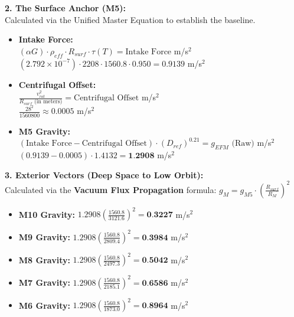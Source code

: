 \documentclass[11pt, a4paper]{article}
\begin{document}
  \vspace{1.0em}
  \noindent \textbf{2. The Surface Anchor (M5):} \\
  \hspace*{1em} Calculated via the Unified Master Equation to establish the baseline.
  \begin{itemize}
    \item \textbf{Intake Force:} \\[0.5em]
    \hspace*{2em} $(\alpha G) \cdot \rho_{eff} \cdot R_{surf} \cdot \tau(T) = \text{Intake Force}$ m/s$^2$ \\[1em]
    \hspace*{2em} $(2.792 \times 10^{-7}) \cdot 2208 \cdot 1560.8 \cdot 0.950 = 0.9139$ m/s$^2$
    
    \item \textbf{Centrifugal Offset:} \\[0.5em]
    \hspace*{2em} $\frac{v_{rot}^2}{R_{surf} \text{ (in meters)}} = \text{Centrifugal Offset}$ m/s$^2$ \\[1em]
    \hspace*{2em} $\frac{28^2}{1560800} \approx 0.0005$ m/s$^2$
    
    \item \textbf{M5 Gravity:} \\[0.5em]
    \hspace*{2em} $(\text{Intake Force} - \text{Centrifugal Offset}) \cdot (D_{ref})^{0.21} = g_{EFM} \text{ (Raw)}$ m/s$^2$ \\[1em]
    \hspace*{2em} $(0.9139 - 0.0005) \cdot 1.4132 = \textbf{1.2908}$ m/s$^2$
  \end{itemize}

  \clearpage
  \noindent \textbf{3. Exterior Vectors (Deep Space to Low Orbit):} \\
  \hspace*{1em} Calculated via the \textbf{Vacuum Flux Propagation} formula: $g_M = g_{M5} \cdot \left( \frac{R_{surf}}{R_M} \right)^2$
  \begin{itemize}
    \item \textbf{M10 Gravity:} $1.2908 \left( \frac{1560.8}{3121.6} \right)^2 = \textbf{0.3227}$ m/s$^2$
    \item \textbf{M9 Gravity:} $1.2908 \left( \frac{1560.8}{2809.4} \right)^2 = \textbf{0.3984}$ m/s$^2$
    \item \textbf{M8 Gravity:} $1.2908 \left( \frac{1560.8}{2497.3} \right)^2 = \textbf{0.5042}$ m/s$^2$
    \item \textbf{M7 Gravity:} $1.2908 \left( \frac{1560.8}{2185.1} \right)^2 = \textbf{0.6586}$ m/s$^2$
    \item \textbf{M6 Gravity:} $1.2908 \left( \frac{1560.8}{1873.0} \right)^2 = \textbf{0.8964}$ m/s$^2$
  \end{itemize}
\end{document}

